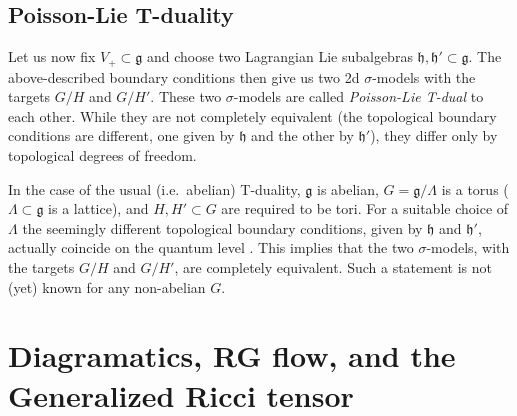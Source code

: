 \documentclass[a4paper]{amsart}
\theoremstyle{plain}
\theoremstyle{definition}
\newcommand{\g}{\mathfrak{g}}
\newcommand{\h}{\mathfrak{h}}
\begin{document}
\subsection{Poisson-Lie T-duality}

Let us now fix $V_+\subset\g$ and choose two Lagrangian Lie subalgebras $\h,\h'\subset\g$. The above-described boundary conditions then give us two 2d $\sigma$-models with the targets $G/H$ and $G/H'$. These two $\sigma$-models are called \emph{Poisson-Lie T-dual} \cite{KSe} to each other. While they are not completely equivalent (the topological boundary conditions are different, one given by $\h$ and the other by $\h'$), they differ only by topological degrees of freedom.

In the case of the usual (i.e.\ abelian) T-duality, $\g$ is abelian, $G=\g/\Lambda$ is a torus ($\Lambda\subset\g$ is a lattice), and $H,H'\subset G$ are required to be tori. For a suitable choice of $\Lambda$ the seemingly different topological boundary conditions, given by $\h$ and $\h'$, actually coincide on the quantum level \cite{KSa}. This implies that the two $\sigma$-models, with the targets $G/H$ and $G/H'$, are completely equivalent. Such a statement is not (yet) known for any non-abelian $G$. 

\section{Diagramatics, RG flow, and the Generalized Ricci tensor}\label{sec:diag}
\end{document}
